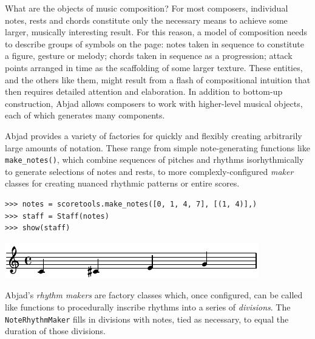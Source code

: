 \documentclass{article}
\begin{document}
What are the objects of music composition? For most composers, individual
notes, rests and chords constitute  only the necessary means to achieve some
larger, musically interesting result. For this reason, a model of composition needs to describe
groups of symbols on the page: notes taken in sequence to constitute a figure,
gesture or melody; chords taken in sequence as a progression; attack points
arranged in time as the scaffolding of some larger texture. These entities, and
the others like them, might result from a flash of compositional intuition that
then requires detailed attention and elaboration. In addition to bottom-up construction, Abjad allows composers to work with higher-level musical objects, each of which generates many components.

Abjad provides a variety of factories for quickly and flexibly
creating arbitrarily large amounts of notation. These range from simple
note-generating functions like \texttt{make\_notes()}, which combine sequences
of pitches and rhythms isorhythmically to generate selections of notes and
rests, to more complexly-configured \emph{maker} classes for creating nuanced
rhythmic patterns or entire scores.

\begin{lstlisting}
>>> notes = scoretools.make_notes([0, 1, 4, 7], [(1, 4)],)
>>> staff = Staff(notes)
>>> show(staff)
\end{lstlisting}
\includegraphics{assets/lilypond-64155bcaa384109d40ae2616a2224dd1.pdf}

\noindent Abjad's \emph{rhythm makers} are factory classes which, once
configured, can be called like functions to procedurally inscribe rhythms into
a series of \emph{divisions}. The \texttt{NoteRhythmMaker} fills in divisions
with notes, tied as necessary, to equal the duration of those divisions.

\end{document}
